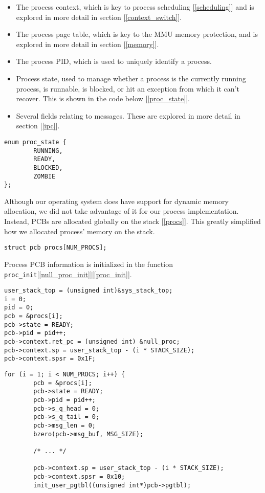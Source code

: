 \documentclass[12pt]{article}
\newcommand{\code}[1]{\colorbox{codegray}{\texttt{\footnotesize{#1}}}}
\begin{document}
\begin{itemize}
	\item The process context, which is key to process
	      scheduling [\ref{scheduling}] and is explored in more detail in section
	       [\ref{context_switch}].
	\item The process page table, which is key to the MMU
	      memory protection, and is explored in more detail in
	      section [\ref{memory}].
	\item The process PID, which is used to uniquely identify a
	      process.
	\item Process state, used to manage whether a process is
	      the currently running process, is runnable, is blocked,
	      or hit an exception from which it can't recover.  This
	      is shown in the code below [\ref{proc_state}].
	\item Several fields relating to messages.  These are
	      explored in more detail in section [\ref{ipc}].
\end{itemize}

\begin{lstlisting}[caption={src/proc.h:proc\_state}, label={proc_state}]
enum proc_state {
		RUNNING,
		READY,
		BLOCKED,
		ZOMBIE
};
\end{lstlisting}

Although our operating system does have support for dynamic
memory allocation, we did not take advantage of it for our
process implementation.  Instead, PCBs are allocated globally
on the stack [\ref{procs}].  This greatly simplified how we allocated
process' memory on the stack.

\begin{lstlisting}[caption={src/proc.c:procs}, label={procs}]
struct pcb procs[NUM_PROCS];
\end{lstlisting}

Process PCB information is initialized in the function
\code{proc\_init}[\ref{null_proc_init}][\ref{proc_init}].

\begin{lstlisting}[caption={src/proc.c:proc\_init}, label={null_proc_init}]
user_stack_top = (unsigned int)&sys_stack_top;
i = 0;
pid = 0;
pcb = &procs[i];
pcb->state = READY;
pcb->pid = pid++;
pcb->context.ret_pc = (unsigned int) &null_proc;
pcb->context.sp = user_stack_top - (i * STACK_SIZE);
pcb->context.spsr = 0x1F;
\end{lstlisting}

\begin{lstlisting}[caption={src/proc.c:proc\_init}, label={proc_init}]
for (i = 1; i < NUM_PROCS; i++) {
		pcb = &procs[i];
		pcb->state = READY;
		pcb->pid = pid++;
		pcb->s_q_head = 0;
		pcb->s_q_tail = 0;
		pcb->msg_len = 0;
		bzero(pcb->msg_buf, MSG_SIZE);

		/* ... */

		pcb->context.sp = user_stack_top - (i * STACK_SIZE);
		pcb->context.spsr = 0x10;
		init_user_pgtbl((unsigned int*)pcb->pgtbl);
\end{lstlisting}
\end{document}
